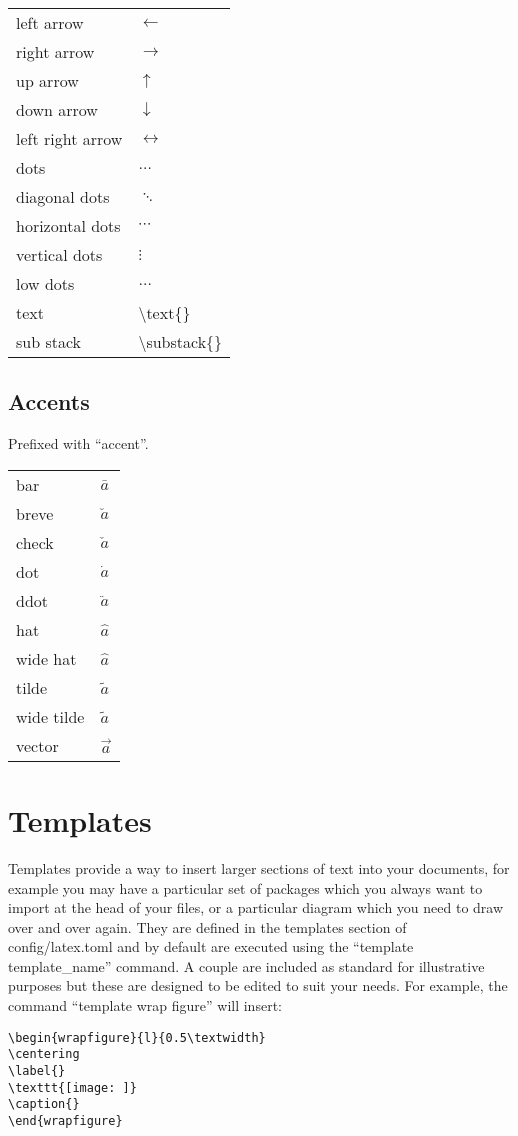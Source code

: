 \documentclass[12pt, a4paper]{article}
\begin{document}
\begin{longtable}{ll}
left arrow & $\leftarrow$ \\
right arrow & $\rightarrow$ \\
up arrow & $\uparrow$ \\
down arrow & $\downarrow$ \\
left right arrow & $\leftrightarrow$ \\
dots & $\dots$ \\
diagonal dots & $\ddots$ \\
horizontal dots & $\cdots$ \\
vertical dots & $\vdots$ \\
low dots & $\ldots$ \\
text & \textbackslash text\{\} \\
sub stack & \textbackslash substack\{\} \\
\end{longtable}

\subsection{Accents}
Prefixed with ``accent''.

\begin{longtable}{ll}
bar & $\bar{a}$ \\
breve & $\breve{a}$ \\
check & $\check{a}$ \\
dot & $\dot{a}$ \\
ddot & $\ddot{a}$ \\
hat & $\hat{a}$ \\
wide hat & $\widehat{a}$ \\
tilde & $\tilde{a}$ \\
wide tilde & $\widetilde{a}$ \\
vector & $\vec{a}$ \\
\end{longtable}

\section{Templates}
Templates provide a way to insert larger sections of text into your documents, for example you may have a particular set of packages which you always want to import at the head of your files, or a particular diagram which you need to draw over and over again. They are defined in the templates section of config/latex.toml and by default are executed using the ``template template\_name'' command. A couple are included as standard for illustrative purposes but these are designed to be edited to suit your needs. For example, the command ``template wrap figure'' will insert:

\begin{verbatim}
\begin{wrapfigure}{l}{0.5\textwidth}
\centering
\label{}
\texttt{[image: ]}
\caption{}
\end{wrapfigure}
\end{verbatim}
\end{document}
